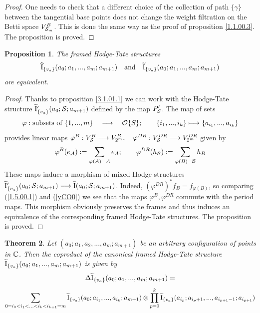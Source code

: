 \documentclass[10pt]{article}
\newtheorem{theorem}{Theorem}[section]
\newtheorem{proposition}[theorem]{Proposition}
\begin{document}
\begin{proof} One needs to check  that 
a different choice of the collection of 
path $\{\gamma\}$ between the tangential base points does not change 
the weight filtration on the Betti space $V_{{\cal S}_m}^B$. This is done the same 
way as the proof of proposition \ref{1.1.00.3}. The proposition is proved. 


\end{proof}

\begin{proposition} \label{1.1.01.1} 
The framed Hodge-Tate structures 
$$
\widehat {\rm I}_{\{v_a\}}(a_0; a_1, ..., a_m; a_{m+1})\quad \mbox{and} \quad  
\widetilde {\rm I}_{\{v_a\}}(a_0; a_1, ..., a_m; a_{m+1})
$$ 
are equivalent. 
\end{proposition} 

\begin{proof} Thanks to proposition \ref{3.1.01.1} we can work with the Hodge-Tate structure 
${\widetilde {\rm I}}'_{\{v_a\}}(a_0; {\cal S}; a_{m+1})$ 
defined by the map $P'_{{\cal S}}$. The map of sets 
$$
\varphi: \mbox{subsets of  $\{1, ..., m\}$} \quad \longrightarrow 
\quad {\cal O}\{S\}; \qquad \{i_1, ..., i_k\} \longmapsto 
\{a_{i_1}, ..., a_{i_k}\}
$$
provides linear maps
$
\varphi^B: V^B_{{\cal S}} \longrightarrow V^B_{2^m}, \quad \varphi^{DR}: V^{DR}_{{\cal S}} \longrightarrow V^{DR}_{2^m}
$ 
given by 
$$
\varphi^B(e_{{\cal A}}):= \sum_{\varphi(A) ={\cal A} }e_{{ A}}; \qquad 
\varphi^{DR}(h_{{\cal B}}):= \sum_{\varphi(B) ={\cal B} }h_{{ B}}
$$
These maps induce a morphism of mixed Hodge structures 
${\widetilde {\rm I}}'_{\{v_a\}}(a_0; {\cal S}; a_{m+1}) \longrightarrow 
{\widehat {\rm I}}(a_0; {\cal S}; a_{m+1})$. Indeed, 
$(\varphi^{DR})^* f_{B} = f_{{\varphi(B)}}$, so comparing (\ref{1.5.00.1}) and (\ref{yCO0}) we see that 
the maps $\varphi^B,\varphi^{DR}$ commute with the period maps. 
This morphism obviously preserves the frames and thus induces an 
equivalence of the corresponding framed 
Hodge-Tate structures. The proposition is proved. 


\end{proof}

\begin{theorem} \label{CP11} Let $(a_0; a_1, a_2, ..., a_m; a_{m+1})$ be an 
arbitrary configuration of points in ${\mathbb C}$. Then the coproduct  
of the canonical framed Hodge-Tate structure 
${\widetilde {\rm I}}_{\{v_a\}}(a_0; a_1, ..., a_m; a_{m+1})$ is given by
\begin{equation} \label{CP2*}
\Delta {\widetilde {\rm I}}_{\{v_a\}}(a_0; a_1,  ..., a_m; a_{m+1})= 
\end{equation}
$$
\sum_{0 = i_0 < i_1 < ... < i_k < i_{k+1} = m} 
{\widetilde {\rm I}}_{\{v_a\}}(a_0; a_{i_1}, ..., a_{i_k}; a_{m+1}) \otimes \prod_{p =0 }^k
{\widetilde {\rm I}}_{\{v_a\}}(a_{i_{p}}; a_{i_{p}+1}, ..., a_{i_{p+1}-1}; a_{i_{p+1}})
$$
\end{theorem}
\end{document}
